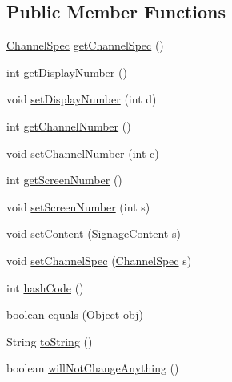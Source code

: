 \subsection*{Public Member Functions}
\begin{DoxyCompactItemize}
\item 
\hyperlink{classgov_1_1fnal_1_1ppd_1_1dd_1_1xml_1_1ChannelSpec}{Channel\-Spec} \hyperlink{classgov_1_1fnal_1_1ppd_1_1dd_1_1xml_1_1messages_1_1ChangeChannel_a198eba95e02cad4a6a1ade32d51397f7}{get\-Channel\-Spec} ()
\item 
int \hyperlink{classgov_1_1fnal_1_1ppd_1_1dd_1_1xml_1_1messages_1_1ChangeChannel_ad32c77790f4b9470830aa9f8b9800ca7}{get\-Display\-Number} ()
\item 
void \hyperlink{classgov_1_1fnal_1_1ppd_1_1dd_1_1xml_1_1messages_1_1ChangeChannel_a2c0ae52a935363b9698581273a60e762}{set\-Display\-Number} (int d)
\item 
int \hyperlink{classgov_1_1fnal_1_1ppd_1_1dd_1_1xml_1_1messages_1_1ChangeChannel_a32b0400d4ea73ceb5406f74b319b8ec2}{get\-Channel\-Number} ()
\item 
void \hyperlink{classgov_1_1fnal_1_1ppd_1_1dd_1_1xml_1_1messages_1_1ChangeChannel_ab2beec4d9585f23e89d4116e880763ef}{set\-Channel\-Number} (int c)
\item 
int \hyperlink{classgov_1_1fnal_1_1ppd_1_1dd_1_1xml_1_1messages_1_1ChangeChannel_a364be5f8c23a5ef652af293f62cebec3}{get\-Screen\-Number} ()
\item 
void \hyperlink{classgov_1_1fnal_1_1ppd_1_1dd_1_1xml_1_1messages_1_1ChangeChannel_a8c702c48dffcb45afbde4f13e44012dc}{set\-Screen\-Number} (int s)
\item 
void \hyperlink{classgov_1_1fnal_1_1ppd_1_1dd_1_1xml_1_1messages_1_1ChangeChannel_a5995c59f590b176b2423f610e8a3e03c}{set\-Content} (\hyperlink{interfacegov_1_1fnal_1_1ppd_1_1dd_1_1signage_1_1SignageContent}{Signage\-Content} s)
\item 
void \hyperlink{classgov_1_1fnal_1_1ppd_1_1dd_1_1xml_1_1messages_1_1ChangeChannel_ae089df11564abd87bf3faeb34e954168}{set\-Channel\-Spec} (\hyperlink{classgov_1_1fnal_1_1ppd_1_1dd_1_1xml_1_1ChannelSpec}{Channel\-Spec} s)
\item 
int \hyperlink{classgov_1_1fnal_1_1ppd_1_1dd_1_1xml_1_1messages_1_1ChangeChannel_ad00b0b945f9bedc094d5b23c42fa9d20}{hash\-Code} ()
\item 
boolean \hyperlink{classgov_1_1fnal_1_1ppd_1_1dd_1_1xml_1_1messages_1_1ChangeChannel_a804b5accdf9e75ac29b314e779aefb80}{equals} (Object obj)
\item 
String \hyperlink{classgov_1_1fnal_1_1ppd_1_1dd_1_1xml_1_1messages_1_1ChangeChannel_a81f2ebb5d2905707834251ba034a3568}{to\-String} ()
\item 
boolean \hyperlink{classgov_1_1fnal_1_1ppd_1_1dd_1_1xml_1_1messages_1_1ChangeChannel_ac09ef4cb33253dfb7c60a9f6d96c312c}{will\-Not\-Change\-Anything} ()
\end{DoxyCompactItemize}
